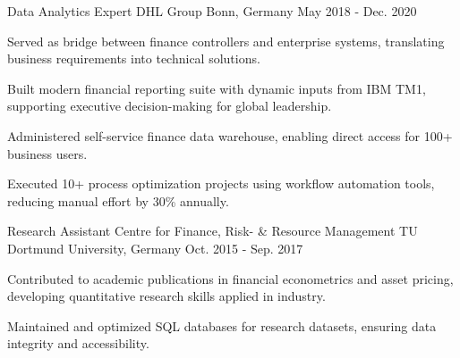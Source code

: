 \begin{cventries}
  
\cventry
  {Data Analytics Expert} %
  {DHL Group} %
  {Bonn, Germany} %
  {May 2018 - Dec. 2020} %
  {
    \begin{cvitems} %
      \item {Served as bridge between finance controllers and enterprise systems, translating business requirements into technical solutions.}
      \item {Built modern financial reporting suite with dynamic inputs from IBM TM1, supporting executive decision-making for global leadership.}
      \item {Administered self-service finance data warehouse, enabling direct access for 100+ business users.}
      \item {Executed 10+ process optimization projects using workflow automation tools, reducing manual effort by 30\% annually.}
    \end{cvitems}
  }

\cventry
{Research Assistant} %
{Centre for Finance, Risk- \& Resource Management} %
{TU Dortmund University, Germany} %
{Oct. 2015 - Sep. 2017} %
{
  \begin{cvitems} %
    \item {Contributed to academic publications in financial econometrics and asset pricing, developing quantitative research skills applied in industry.}
    \item {Maintained and optimized SQL databases for research datasets, ensuring data integrity and accessibility.}
  \end{cvitems}
}

\end{cventries}
